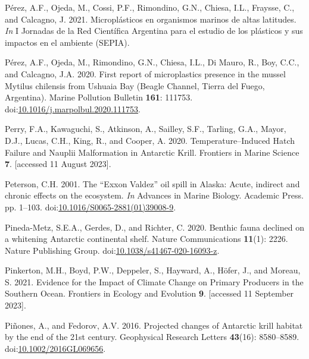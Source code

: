 \documentclass[
]{article}
\newlength{\cslhangindent}
\newenvironment{CSLReferences}[2] %
 {\begin{list}{}{%
  \setlength{\itemindent}{0pt}
  \setlength{\leftmargin}{0pt}
  \setlength{\parsep}{0pt}
  \ifodd #1
   \setlength{\leftmargin}{\cslhangindent}
   \setlength{\itemindent}{-1\cslhangindent}
  \fi
  \setlength{\itemsep}{#2\baselineskip}}}
 {\end{list}}
\begin{document}
\begin{CSLReferences}{1}{0}
Pérez, A.F., Ojeda, M., Cossi, P.F., Rimondino, G.N., Chiesa, I.L.,
Fraysse, C., and Calcagno, J. 2021. {Micropl{á}sticos en organismos
marinos de altas latitudes}. \emph{In} {I Jornadas de la Red
Cient{í}fica Argentina para el estudio de los pl{á}sticos y sus impactos
en el ambiente (SEPIA)}.

Pérez, A.F., Ojeda, M., Rimondino, G.N., Chiesa, I.L., Di Mauro, R.,
Boy, C.C., and Calcagno, J.A. 2020. First report of microplastics
presence in the mussel {Mytilus} chilensis from {Ushuaia Bay} ({Beagle
Channel}, {Tierra} del {Fuego}, {Argentina}). Marine Pollution Bulletin
\textbf{161}: 111753.
doi:\href{https://doi.org/10.1016/j.marpolbul.2020.111753}{10.1016/j.marpolbul.2020.111753}.

Perry, F.A., Kawaguchi, S., Atkinson, A., Sailley, S.F., Tarling, G.A.,
Mayor, D.J., Lucas, C.H., King, R., and Cooper, A. 2020.
Temperature--{Induced Hatch Failure} and {Nauplii Malformation} in
{Antarctic Krill}. Frontiers in Marine Science \textbf{7}. {[}accessed
11 August 2023{]}.

Peterson, C.H. 2001. The {``{Exxon Valdez}''} oil spill in {Alaska}:
{Acute}, indirect and chronic effects on the ecosystem. \emph{In}
Advances in {Marine Biology}. Academic Press. pp. 1--103.
doi:\href{https://doi.org/10.1016/S0065-2881(01)39008-9}{10.1016/S0065-2881(01)39008-9}.

Pineda-Metz, S.E.A., Gerdes, D., and Richter, C. 2020. Benthic fauna
declined on a whitening {Antarctic} continental shelf. Nature
Communications \textbf{11}(1): 2226. Nature Publishing Group.
doi:\href{https://doi.org/10.1038/s41467-020-16093-z}{10.1038/s41467-020-16093-z}.

Pinkerton, M.H., Boyd, P.W., Deppeler, S., Hayward, A., Höfer, J., and
Moreau, S. 2021. Evidence for the {Impact} of {Climate Change} on
{Primary Producers} in the {Southern Ocean}. Frontiers in Ecology and
Evolution \textbf{9}. {[}accessed 11 September 2023{]}.

Piñones, A., and Fedorov, A.V. 2016. Projected changes of {Antarctic}
krill habitat by the end of the 21st century. Geophysical Research
Letters \textbf{43}(16): 8580--8589.
doi:\href{https://doi.org/10.1002/2016GL069656}{10.1002/2016GL069656}.


\end{CSLReferences}
\end{document}
